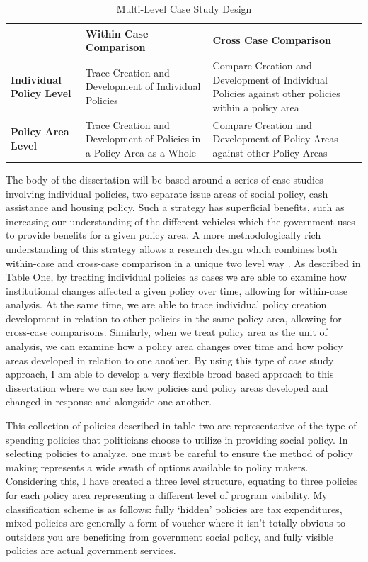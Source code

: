\documentclass[12pt]{article}
\begin{document}
\begin{table}
\centering
    \begin{tabularx}{\textwidth}{XXX} \toprule
           & \textbf{Within Case Comparison} & \textbf{Cross Case Comparison                                                                              } \\ \midrule
    \textbf{Individual Policy Level} & Trace Creation and Development of Individual Policies        & Compare Creation and Development of Individual Policies against other policies within a policy area \\
    \textbf{Policy Area Level}       & Trace Creation and Development of Policies in a Policy Area as a Whole & Compare Creation and Development of Policy Areas against other Policy Areas                         \\ \bottomrule
    \end{tabularx}
  \caption{Multi-Level Case Study Design}
  \label{tab:casestudy}
\end{table}

The body of the dissertation will be based around a series of case studies involving individual policies, two separate issue areas of social policy, cash assistance and housing policy. Such a strategy has superficial benefits, such as increasing our understanding of the different vehicles which the government uses to provide benefits for a given policy area. A more methodologically rich understanding of this strategy allows a research design which combines both within-case and cross-case comparison in a unique two level way \citep{george2005, goertz2012}. As described in Table One, by treating individual policies as cases we are able to examine how institutional changes affected a given policy over time, allowing for within-case analysis. At the same time, we are able to trace individual policy creation development in relation to other policies in the same policy area, allowing for cross-case comparisons. Similarly, when we treat policy area as the unit of analysis, we can examine how a policy area changes over time and how policy areas developed in relation to one another. By using this type of case study approach, I am able to develop a very flexible broad based approach to this dissertation where we can see how policies and policy areas developed and changed in response and alongside one another. 

This collection of policies described in table two are representative of the type of spending policies that politicians choose to utilize in providing social policy. In selecting policies to analyze, one must be careful to ensure the method of policy making represents a wide swath of options available to policy makers. Considering this, I have created a three level structure, equating to three policies for each policy area representing a different level of program visibility. My classification scheme is as follows: fully `hidden' policies are tax expenditures, mixed policies are generally a form of voucher where it isn't totally obvious to outsiders you are benefiting from government social policy, and fully visible policies are actual government services. 
\end{document}
